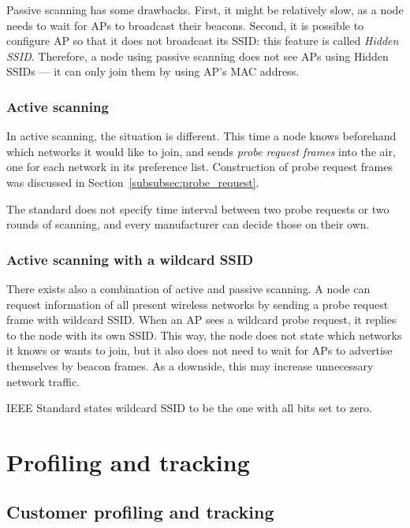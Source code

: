 \documentclass[12pt,a4paper,oneside,pdftex]{report}
\begin{document}
Passive scanning has some drawbacks. First, it might be relatively slow, as a node needs to wait for APs to broadcast their beacons. Second, it is possible to configure AP so that it does not broadcast its SSID: this feature is called \emph{Hidden SSID}. Therefore, a node using passive scanning does not see APs using Hidden SSIDs --- it can only join them by using AP's MAC address.

\subsection{Active scanning}
\label{subsec:active_scanning}

In active scanning, the situation is different. This time a node knows beforehand which networks it would like to join, and sends \emph{probe request frames} into the air, one for each network in its preference list. Construction of probe request frames was discussed in Section~\ref{subsubsec:probe_request}.

The standard does not specify time interval between two probe requests or two rounds of scanning, and every manufacturer can decide those on their own.

\subsection{Active scanning with a wildcard SSID}
\label{subsec:active_wildcard}

There exists also a combination of active and passive scanning. A node can request information of all present wireless networks by sending a probe request frame with wildcard SSID. When an AP sees a wildcard probe request, it replies to the node with its own SSID. This way, the node does not state which networks it knows or wants to join, but it also does not need to wait for APs to advertise themselves by beacon frames. As a downside, this may increase unnecessary network traffic.

IEEE Standard states wildcard SSID to be the one with all bits set to zero. 




\chapter{Profiling and tracking}
\label{chapter:profiling}

\section{Customer profiling and tracking}
\label{sec:profiling}
\end{document}
